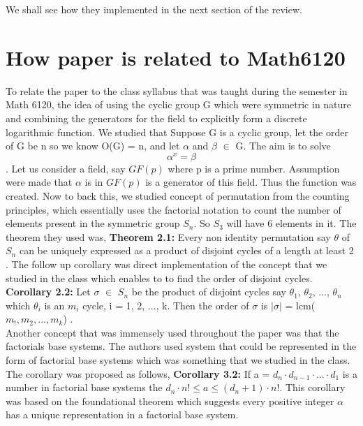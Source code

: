 \documentclass{IEEEtran}
\begin{document}
We shall see how they implemented in the next section of the review. \newline

\section{How paper is related to Math6120}
To relate the paper to the class syllabus that was taught during the semester in Math 6120, the idea of using the cyclic group G which were symmetric in nature and combining the generators for the field to explicitly form a discrete logarithmic function. We studied that Suppose G is a cyclic group, let the order of G be n so we know O(G) = n, and let \(\alpha\) and \(\beta\) \(\in\) G. The aim is to solve \[\alpha^x = \beta\]. Let us consider a field, say $GF(p)$ where p is a prime number. Assumption were made that \(\alpha\) is in $GF(p)$ is a generator of this field. Thus the function was created. Now to back this, we studied concept of permutation from the counting principles, which essentially uses the factorial notation to count the number of elements present in the symmetric group $S_n$. So $S_3$ will have 6 elements in it. The theorem they used was, \newline
\textbf{Theorem 2.1:} Every non identity permutation say \(\theta\) of $S_n$ can be uniquely expressed as a product of disjoint cycles of a length at least 2 \cite{herstein1975topics}. \newline
The follow up corollary was direct implementation of the concept that we studied in the class which enables to to find the order of disjoint cycles. \newline
\textbf{Corollary 2.2:} Let \(\sigma\) \(\in\) $S_n$ be the product of disjoint cycles say \(\theta_1\), \(\theta_{2}\), ..., \(\theta_{n}\) which \(\theta_i\) is an $m_i$ cycle, i = 1, 2, ..., k. Then the order of \(\sigma\) is $|\sigma|$ = lcm($m_!, m_2, ..., m_k$) \cite{rotman2015advanced}. \\
Another concept that was immensely used throughout the paper was that the factorials base systems. The authors used system that could be represented in the form of factorial base systems which was something that we studied in the class. The corollary was proposed as follows, \newline
\textbf{Corollary 3.2:} If a = $d_n \cdot d_{n-1} \cdot ... \cdot d_1$ is a number in factorial base systems the $d_n \cdot n! \leq a \leq (d_n + 1) \cdot n!$. This corollary was based on the foundational theorem which suggests every positive integer \(\alpha\) has a unique representation in a factorial base system. \newline
\end{document}
